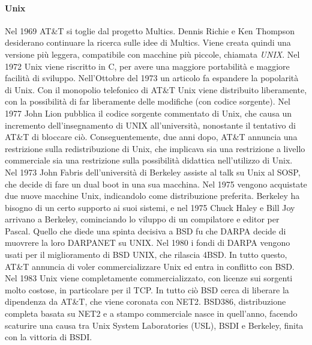 \paragraph*{Unix} Nel 1969 AT\&T si toglie dal progetto Multics. Dennis Richie e Ken Thompson desiderano continuare la ricerca sulle idee di Multics. Viene creata quindi una versione pi\`u leggera, compatibile con macchine pi\`u piccole, chiamata \textit{UNIX}. Nel 1972 Unix viene riscritto in C, per avere una maggiore portabilit\`a e maggiore facilit\`a di sviluppo. Nell'Ottobre del 1973 un articolo fa espandere la popolarit\`a di Unix.
Con il monopolio telefonico di AT\&T Unix viene distribuito liberamente, con la possibilit\`a di far liberamente delle modifiche (con codice sorgente). Nel 1977 John Lion pubblica il codice sorgente commentato di Unix, che causa un incremento dell'insegnamento di UNIX all'universit\`a, nonostante il tentativo di AT\&T di bloccare ci\`o. Conseguentemente, due anni dopo, AT\&T annuncia una restrizione sulla redistribuzione di Unix, che implicava sia una restrizione a livello commerciale sia una restrizione sulla possibilit\`a didattica nell'utilizzo di Unix.
Nel 1973 John Fabris dell'universit\`a di Berkeley assiste al talk su Unix al SOSP, che decide di fare un dual boot in una sua macchina. Nel 1975 vengono acquistate due nuove macchine Unix, indicandolo come distribuzione preferita. Berkeley ha bisogno di un certo supporto ai suoi sistemi, e nel 1975 Chuck Haley e Bill Joy arrivano a Berkeley, cominciando lo viluppo di un compilatore e editor per Pascal. Quello che diede una spinta decisiva a BSD fu che DARPA decide di muovrere la loro DARPANET su UNIX. Nel 1980 i fondi di DARPA vengono usati per il miglioramento di BSD UNIX, che rilascia 4BSD. In tutto questo, AT\&T annuncia di voler commercializzare Unix ed entra in conflitto con BSD. Nel 1983 Unix viene completamente commercializzato, con licenze sui sorgenti molto costose, in particolare per il TCP. In tutto ci\`o BSD cerca di liberare la dipendenza da AT\&T, che viene coronata con NET2. BSD386, distribuzione completa basata su NET2 e a stampo commerciale nasce in quell'anno, facendo scaturire una causa tra Unix System Laboratories (USL), BSDI e Berkeley, finita con la vittoria di BSDI.
